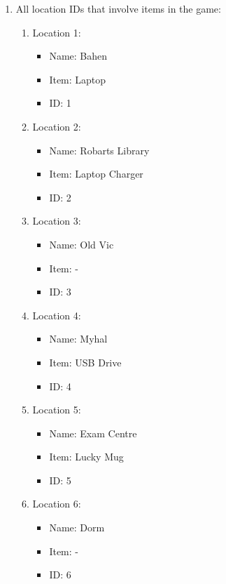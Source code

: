 \documentclass[11pt]{article}
\begin{document}
\begin{enumerate}
\item All location IDs that involve items in the game:
\begin{enumerate}
        \item Location 1:
    \begin{itemize}
    \item Name: Bahen
    \item Item: Laptop
    \item ID: 1
    \end{itemize}
        \item Location 2:
    \begin{itemize}
    \item Name: Robarts Library
    \item Item: Laptop Charger
    \item ID: 2
    \end{itemize}
        \item Location 3:
    \begin{itemize}
    \item Name: Old Vic
    \item Item: -
    \item ID: 3
    \end{itemize}
        \item Location 4:
    \begin{itemize}
    \item Name: Myhal
    \item Item: USB Drive
    \item ID: 4
    \end{itemize}
        \item Location 5:
    \begin{itemize}
    \item Name: Exam Centre
    \item Item: Lucky Mug
    \item ID: 5
    \end{itemize}
        \item Location 6:
    \begin{itemize}
    \item Name: Dorm
    \item Item: -
    \item ID: 6
    \end{itemize}
\end{enumerate}



\end{enumerate}
\end{document}
